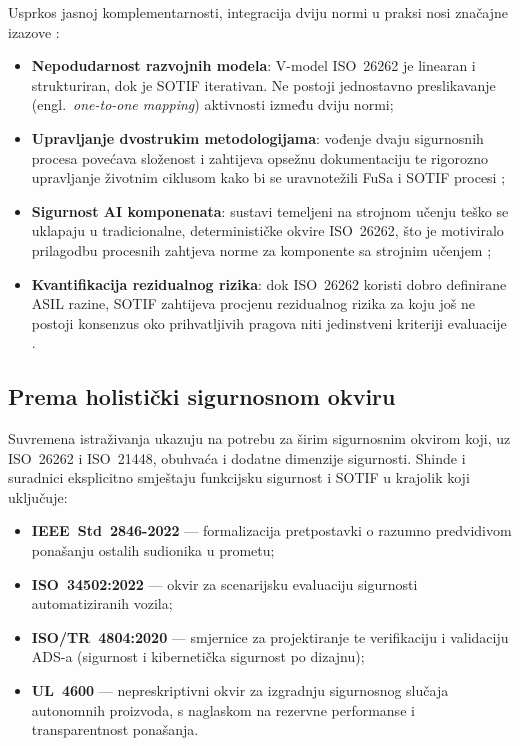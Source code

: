 Usprkos jasnoj komplementarnosti, integracija dviju normi u praksi nosi značajne izazove \cite{patel2025sotifslr, shinde2026reimagining}:

\begin{itemize}
  \item \textbf{Nepodudarnost razvojnih modela}: V-model ISO~26262 je linearan i strukturiran, dok je SOTIF iterativan. Ne postoji jednostavno preslikavanje (engl.\ \textit{one-to-one mapping}) aktivnosti između dviju normi;
  \item \textbf{Upravljanje dvostrukim metodologijama}: vođenje dvaju sigurnosnih procesa povećava složenost i zahtijeva opsežnu dokumentaciju te rigorozno upravljanje životnim ciklusom kako bi se uravnotežili FuSa i SOTIF procesi \cite{patel2025sotifslr};
  \item \textbf{Sigurnost AI komponenata}: sustavi temeljeni na strojnom učenju teško se uklapaju u tradicionalne, determinističke okvire ISO~26262, što je motiviralo prilagodbu procesnih zahtjeva norme za komponente sa strojnim učenjem \cite{shinde2026reimagining};
  \item \textbf{Kvantifikacija rezidualnog rizika}: dok ISO~26262 koristi dobro definirane ASIL razine, SOTIF zahtijeva procjenu rezidualnog rizika za koju još ne postoji konsenzus oko prihvatljivih pragova niti jedinstveni kriteriji evaluacije \cite{patel2025sotifslr}.
\end{itemize}

\subsection{Prema holistički sigurnosnom okviru}

Suvremena istraživanja ukazuju na potrebu za širim sigurnosnim okvirom koji, uz ISO~26262 i ISO~21448, obuhvaća i dodatne dimenzije sigurnosti. Shinde i suradnici \cite{shinde2026reimagining} eksplicitno smještaju funkcijsku sigurnost i SOTIF u krajolik koji uključuje:

\begin{itemize}
  \item \textbf{IEEE~Std~2846-2022} — formalizacija pretpostavki o razumno predvidivom ponašanju ostalih sudionika u prometu;
  \item \textbf{ISO~34502:2022} — okvir za scenarijsku evaluaciju sigurnosti automatiziranih vozila;
  \item \textbf{ISO/TR~4804:2020} — smjernice za projektiranje te verifikaciju i validaciju ADS-a (sigurnost i kibernetička sigurnost po dizajnu);
  \item \textbf{UL~4600} — nepreskriptivni okvir za izgradnju sigurnosnog slučaja autonomnih proizvoda, s naglaskom na rezervne performanse i transparentnost ponašanja.
\end{itemize}

